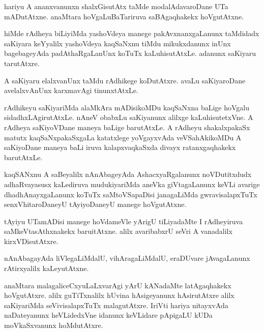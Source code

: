 \documentclass{article}
\begin{document}
\begin{mn}%
hariyu A ananxvanunxn shalxGisutAtx taMde modalAdavaroDane UTa mADutAtxne. anaMtara 
hoVgaLuBaTariruva saBAgaqhakekx hoVgutAtxne.
\end{mn}

\begin{mn}%
hiMde rAdheya biLiyiMda yashoVdeya manege pakAvxnanxgaLanunx taMdidadx saKiyara keYyalilx 
yashoVdeya kaqSaNxnu tiMdu mikukxdanunx inUnx bagebageyAda padAthaRgaLanUnx koTuTx 
kaLuhisutAtxLe. adanunx saKiyaru tarutAtxre.
\end{mn}

\begin{mn}%
A saKiyaru elalxvanUnx taMdu rAdhikege koDutAtxre. avaLu saKiyaroDane avelalxvAnUnx 
karxmavAgi tinunxtAtxLe.
\end{mn}

\begin{mn}%
rAdhikeyu saKiyariMda alaMkAra mADisikoMDu kaqSaNxna baLige hoVgalu sidadhxLAgirutAtxLe.
nAneV obabxLu saKiyanunx alilxge kaLuhisutetxVne. A rAdheya saKiyoVDane maneya baLige 
barutAtxLe. A rAdheyu shakalxpakaSx matutx kaqSaNxpakaSxgaLa katatxlege yoVgayxvAda 
veVSahAkikoMDu A saKiyoDane maneya baLi iruva kalapxvaqkaSxda divayx ratanxgaqhakekx 
barutAtxLe.
\end{mn}

\begin{mn}%
kaqSANxnu A saBeyalilx nAnAbageyAda AshacxyaRgalanunx noVDutitxdudx adhaRvayasusx 
kaLediruva mudukiyariMda aneVka giVtagaLanunx keVLi avarige dhadhAnayxgaLanunx koTuTx 
saMtoVSapaDisi janagaLiMda gwravisalapxTuTx senxVhitaroDaneyU tAyiyoDaneyU manege 
hoVgutAtxne.
\end{mn}

\begin{mn}%
tAyiyu UTamADisi manege hoVdameVle yArigU tiLiyadaMte I rAdheyiruva saMkeVtasAthxnakekx 
baruitAtxne. alilx avaribabxrU seVri A vanadalilx kirxVDisutAtxre.
\end{mn}

\begin{mn}%
nAnAbagayAda liVlegaLiMdalU, vihAragaLiMdalU, eraDUvare jAvagaLanunx rAtirxyalilx 
kaLeyutAtxne.
\end{mn}

\begin{mn}%
anaMtara malagaliceCxyuLaLxvarAgi yArU kANadaMte latAgaqhakekx hoVgutAtxre. alilx 
guTiTxnalilx hUvina hAsigeyanunx hAsirutAtxre alilx saKiyariMda seVivisalapxTuTx 
malagutAtxre. IriVti hariya nitayxvAda naDateyanunx heVLidedxVne idanunx keVLidare 
pApigaLU kUDa moVkaSxvanunx hoMdutAtxre.
\end{mn}
\end{document}
